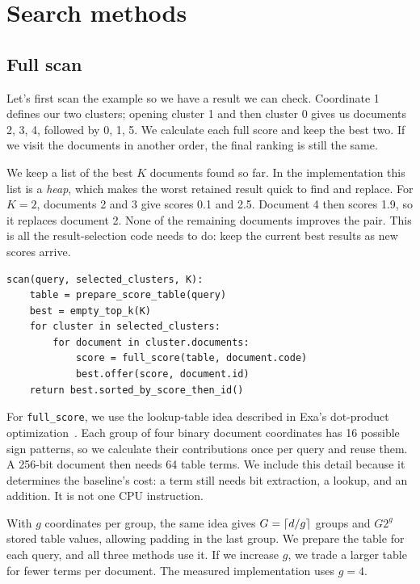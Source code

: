 \section{Search methods}
\subsection{Full scan}
Let's first scan the example so we have a result we can check. Coordinate 1 defines our two
clusters; opening cluster 1 and then cluster 0 gives us documents 2, 3, 4, followed by 0, 1, 5.
We calculate each full score and keep the best two. If we visit the documents in another order,
the final ranking is still the same.

We keep a list of the best $K$ documents found so far. In the implementation this list is a
\emph{heap}, which makes the worst retained result quick to find and replace. For $K=2$,
documents 2 and 3 give scores 0.1 and 2.5. Document 4 then scores 1.9, so it replaces document 2.
None of the remaining documents improves the pair. This is all the result-selection code
needs to do: keep the current best results as new scores arrive.

\begin{lstlisting}[caption={Full scan. Every selected document receives a full score.}]
scan(query, selected_clusters, K):
    table = prepare_score_table(query)
    best = empty_top_k(K)
    for cluster in selected_clusters:
        for document in cluster.documents:
            score = full_score(table, document.code)
            best.offer(score, document.id)
    return best.sorted_by_score_then_id()
\end{lstlisting}

For \texttt{full\_score}, we use the lookup-table idea described in Exa's dot-product
optimization~\cite{exa}. Each group of four binary document coordinates has 16 possible sign
patterns, so we calculate their contributions once per query and reuse them. A 256-bit document
then needs 64 table terms. We include this detail because it determines the baseline's cost:
a term still needs bit extraction, a lookup, and an addition. It is not one CPU instruction.

With $g$ coordinates per group, the same idea gives $G=\left\lceil d/g\right\rceil$ groups and $G2^g$ stored
table values, allowing padding in the last group. We prepare the table for each query, and
all three methods use it. If we increase $g$, we trade a larger table for fewer terms per
document. The measured implementation uses $g=4$.

